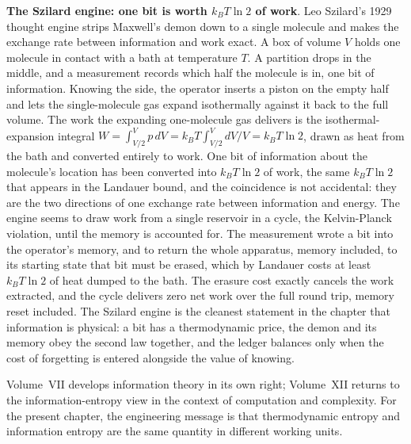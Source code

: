 

\begin{mastery}
\textbf{The Szilard engine: one bit is worth $k_B T \ln 2$ of work}. Leo Szilard's
1929 thought engine strips Maxwell's demon down to a single molecule and makes the
exchange rate between information and work exact. A box of volume $V$ holds one
molecule in contact with a bath at temperature $T$. A partition drops in the
middle, and a measurement records which half the molecule is in, one bit of
information. Knowing the side, the operator inserts a piston on the empty half and
lets the single-molecule gas expand isothermally against it back to the full
volume. The work the expanding one-molecule gas delivers is the isothermal-expansion
integral $W = \int_{V/2}^{V} p\,dV = k_B T \int_{V/2}^{V} dV/V = k_B T \ln 2$,
drawn as heat from the bath and converted entirely to work. One bit of information
about the molecule's location has been converted into $k_B T \ln 2$ of work, the
same $k_B T \ln 2$ that appears in the Landauer bound, and the coincidence is not
accidental: they are the two directions of one exchange rate between information and
energy. The engine seems to draw work from a single reservoir in a cycle, the
Kelvin-Planck violation, until the memory is accounted for. The measurement wrote a
bit into the operator's memory, and to return the whole apparatus, memory included,
to its starting state that bit must be erased, which by Landauer costs at least
$k_B T \ln 2$ of heat dumped to the bath. The erasure cost exactly cancels the work
extracted, and the cycle delivers zero net work over the full round trip, memory
reset included. The Szilard engine is the cleanest statement in the chapter that
information is physical: a bit has a thermodynamic price, the demon and its memory
obey the second law together, and the ledger balances only when the cost of
forgetting is entered alongside the value of knowing.
\end{mastery}

Volume~VII develops information theory in its own right; Volume~XII
returns to the information-entropy view in the context of computation
and complexity. For the present chapter, the engineering message is
that thermodynamic entropy and information entropy are the same
quantity in different working units.

